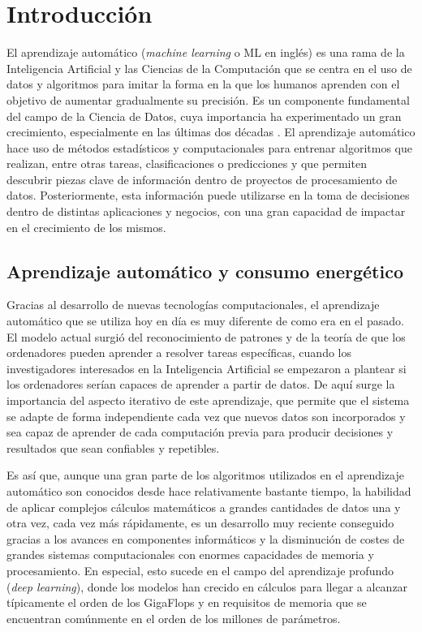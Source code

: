 \chapter{Introducción}
\label{sec:intro}

El aprendizaje automático (\emph{machine learning} o ML en inglés) es una rama de la Inteligencia Artificial y las Ciencias de la Computación que se centra en el uso de datos y algoritmos para imitar la forma en la que los humanos aprenden con el objetivo de aumentar gradualmente su precisión.
Es un componente fundamental del campo de la Ciencia de Datos, cuya importancia ha experimentado un gran crecimiento, especialmente en las últimas dos décadas \cite{cleveland2001}. 
El aprendizaje automático hace uso de métodos estadísticos y computacionales para entrenar algoritmos que realizan, entre otras tareas, clasificaciones o predicciones y que permiten descubrir piezas clave de información dentro de proyectos de procesamiento de datos. 
Posteriormente, esta información puede utilizarse en la toma de decisiones dentro de distintas aplicaciones y negocios, con una gran capacidad de impactar en el crecimiento de los mismos.

\section{Aprendizaje automático y consumo energético}

Gracias al desarrollo de nuevas tecnologías computacionales, el aprendizaje automático que se utiliza hoy en día es muy diferente de como era en el pasado.
El modelo actual surgió del reconocimiento de patrones y de la teoría de que los ordenadores pueden aprender a resolver tareas específicas, cuando los investigadores interesados en la Inteligencia Artificial se empezaron a plantear si los ordenadores serían capaces de aprender a partir de datos.
De aquí surge la importancia del aspecto iterativo de este aprendizaje, que permite que el sistema se adapte de forma independiente cada vez que nuevos datos son incorporados y sea capaz de aprender de cada computación previa para producir decisiones y resultados que sean confiables y repetibles.

Es así que, aunque una gran parte de los algoritmos utilizados en el aprendizaje automático son conocidos desde hace relativamente bastante tiempo, la habilidad de aplicar complejos cálculos matemáticos a grandes cantidades de datos una y otra vez, cada vez más rápidamente, es un desarrollo muy reciente conseguido gracias a los avances en componentes informáticos y la disminución de costes de grandes sistemas computacionales con enormes capacidades de memoria y procesamiento.
En especial, esto sucede en el campo del aprendizaje profundo (\emph{deep learning}), donde los modelos han crecido en cálculos para llegar a alcanzar típicamente el orden de los GigaFlops y en requisitos de memoria que se encuentran comúnmente en el orden de los millones de parámetros.

